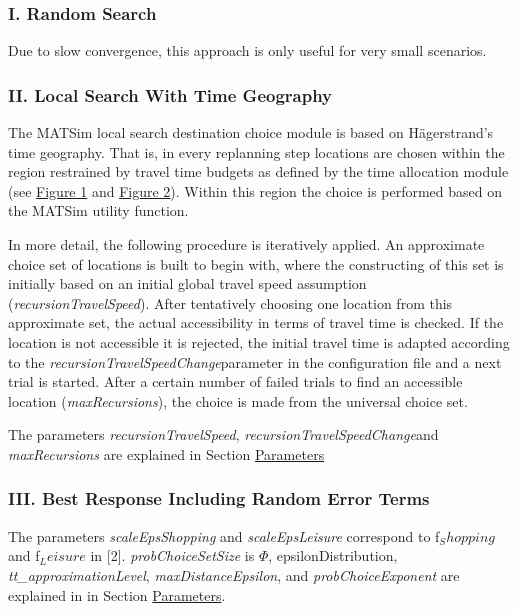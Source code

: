 \documentclass[a4paper,11pt]{report}
\begin{document}
\subsubsection{\textbf{I. Random Search}}

Due to slow convergence, this approach is only useful for very small scenarios.


\subsubsection{\textbf{II. Local Search With Time Geography}}

The MATSim local search destination choice module is  based on Hägerstrand's time geography. That is, in every replanning step  locations are chosen within the region restrained by travel time  budgets as defined by the time allocation module (see \hyperlink{Figure1}{Figure 1} and \hyperlink{Figure2}{Figure 2}). Within this region the choice is performed based on the MATSim utility function.

In more detail, the following procedure is  iteratively applied. An approximate choice set of locations is built to  begin with, where the constructing of this set is initially based on an  initial global travel speed assumption (\emph{recursionTravelSpeed}).  After tentatively choosing one location from this approximate set, the  actual accessibility in terms of travel time is checked. If the location  is not accessible it is rejected, the initial travel time is adapted  according to the \emph{recursionTravelSpeedChange}parameter  in the configuration file and a next trial is started. After a certain  number of failed trials to find an accessible location (\emph{maxRecursions}), the choice is made from the universal choice set.

The parameters \emph{recursionTravelSpeed}, \emph{recursionTravelSpeedChange}and \emph{maxRecursions }are explained in Section \hyperlink{parameters}{Parameters}


\subsubsection{\textbf{III. Best Response Including Random Error Terms}}

The parameters \emph{scaleEpsShopping }and \emph{scaleEpsLeisure }correspond to f$_Shopping$ and f$_Leisure$ in [2]. \emph{probChoiceSetSize }is $\Phi$, epsilonDistribution, \emph{tt\_}\emph{approximationLevel}, \emph{maxDistanceEpsilon}, and \emph{probChoiceExponent }are explained in in Section \hyperlink{parameters}{Parameters}.
\end{document}
